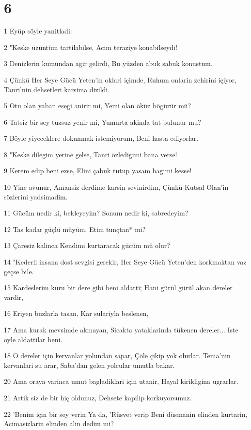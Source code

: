 \chapter{6}

\par 1 Eyüp söyle yanitladi:
\par 2 "Keske üzüntüm tartilabilse, Acim teraziye konabilseydi!
\par 3 Denizlerin kumundan agir gelirdi, Bu yüzden abuk sabuk konustum.
\par 4 Çünkü Her Seye Gücü Yeten'in oklari içimde, Ruhum onlarin zehirini içiyor, Tanri'nin dehsetleri karsima dizildi.
\par 5 Otu olan yaban esegi anirir mi, Yemi olan öküz bögürür mü?
\par 6 Tatsiz bir sey tuzsuz yenir mi, Yumurta akinda tat bulunur mu?
\par 7 Böyle yiyeceklere dokunmak istemiyorum, Beni hasta ediyorlar.
\par 8 "Keske dilegim yerine gelse, Tanri özledigimi bana verse!
\par 9 Kerem edip beni ezse, Elini çabuk tutup yasam bagimi kesse!
\par 10 Yine avunur, Amansiz derdime karsin sevinirdim, Çünkü Kutsal Olan'in sözlerini yadsimadim.
\par 11 Gücüm nedir ki, bekleyeyim? Sonum nedir ki, sabredeyim?
\par 12 Tas kadar güçlü müyüm, Etim tunçtan* mi?
\par 13 Çaresiz kalinca Kendimi kurtaracak gücüm mü olur?
\par 14 "Kederli insana dost sevgisi gerekir, Her Seye Gücü Yeten'den korkmaktan vaz geçse bile.
\par 15 Kardeslerim kuru bir dere gibi beni aldatti; Hani gürül gürül akan dereler vardir,
\par 16 Eriyen buzlarla tasan, Kar sulariyla beslenen,
\par 17 Ama kurak mevsimde akmayan, Sicakta yataklarinda tükenen dereler... Iste öyle aldattilar beni.
\par 18 O dereler için kervanlar yolundan sapar, Çöle çikip yok olurlar. Tema'nin kervanlari su arar, Saba'dan gelen yolcular umutla bakar.
\par 20 Ama oraya varinca umut bagladiklari için utanir, Hayal kirikligina ugrarlar.
\par 21 Artik siz de bir hiç oldunuz, Dehsete kapilip korkuyorsunuz.
\par 22 'Benim için bir sey verin Ya da, 'Rüsvet verip Beni düsmanin elinden kurtarin, Acimasizlarin elinden alin dedim mi?
